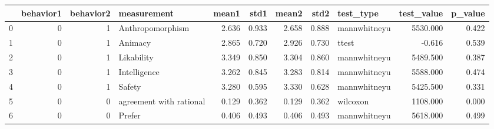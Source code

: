 \begin{tabular}{lrrlrrrrlrr}
\toprule
{} &  behavior1 &  behavior2 &              measurement &  mean1 &   std1 &  mean2 &   std2 &     test\_type &  test\_value &  p\_value \\
\midrule
0 &          0 &          1 &         Anthropomorphism &  2.636 &  0.933 &  2.658 &  0.888 &  mannwhitneyu &    5530.000 &    0.422 \\
1 &          0 &          1 &                  Animacy &  2.865 &  0.720 &  2.926 &  0.730 &         ttest &      -0.616 &    0.539 \\
2 &          0 &          1 &               Likability &  3.349 &  0.850 &  3.304 &  0.860 &  mannwhitneyu &    5489.500 &    0.387 \\
3 &          0 &          1 &             Intelligence &  3.262 &  0.845 &  3.283 &  0.814 &  mannwhitneyu &    5588.000 &    0.474 \\
4 &          0 &          1 &                   Safety &  3.280 &  0.595 &  3.330 &  0.628 &  mannwhitneyu &    5425.500 &    0.331 \\
5 &          0 &          0 &  agreement with rational &  0.129 &  0.362 &  0.129 &  0.362 &      wilcoxon &    1108.000 &    0.000 \\
6 &          0 &          0 &                   Prefer &  0.406 &  0.493 &  0.406 &  0.493 &  mannwhitneyu &    5618.000 &    0.499 \\
\bottomrule
\end{tabular}
